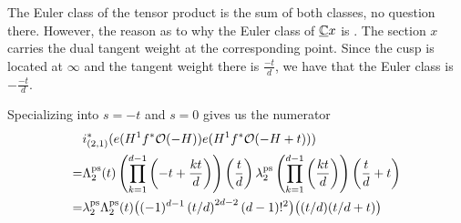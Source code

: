 \documentclass[12pt]{memoir}
\begin{document}
\begin{Rmk}
    The Euler class of the tensor product is the sum of both classes, no question there. However, the reason as to why the Euler class of \(\underline{\mathbb{C}}x\) is . The section \(x\) carries the dual tangent weight at the corresponding point. Since the cusp is located at \(\infty\) and the tangent weight there is \(\frac{-t}{d}\), we have that the Euler class is \(-\frac{-t}{d}\).
\end{Rmk}

Specializing into \(s=-t\) and \(s=0\) gives us the numerator
\begin{align*}
      & i_{(2,1)}^\ast(e(H^1f^\ast\mathcal{O}(-H))e(H^1f^\ast\mathcal{O}(-H+t)))                                                                                                                                     \\
    = & \Lambda_2^{\operatorname{\mathrm{ps}}}(t)\left(\prod_{k=1}^{d-1}\left(-t+\frac{kt}{d}\right)\right)\left(\frac{t}{d}\right)\lambda_2^{\operatorname{\mathrm{ps}}}\left(\prod_{k=1}^{d-1}\left(\frac{kt}{d}\right)\right)\left(\frac{t}{d}+t\right) \\
    = & \lambda_2^{\operatorname{\mathrm{ps}}}\Lambda_2^{\operatorname{\mathrm{ps}}}(t)\bigl((-1)^{d-1}\left({t}/{d}\right)^{2d-2}(d-1)!^2\bigr)\bigl((t/d)(t/d+t)\bigr)
\end{align*}
\end{document}

